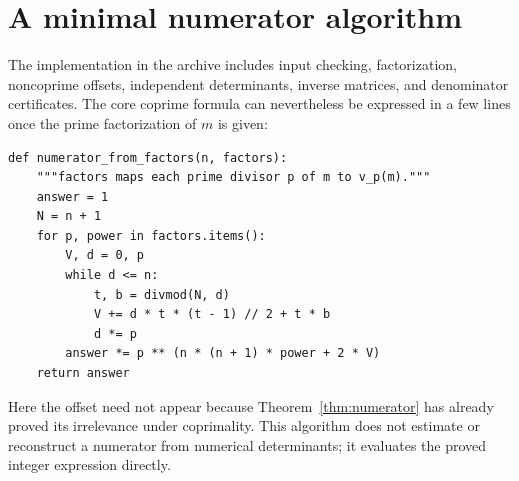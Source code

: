 \documentclass[11pt,a4paper]{article}
\numberwithin{equation}{section}
\theoremstyle{definition}
\theoremstyle{remark}
\begin{document}
\section{A minimal numerator algorithm}\label{app:algorithm}
The implementation in the archive includes input checking, factorization, noncoprime offsets, independent determinants, inverse matrices, and denominator certificates. The core coprime formula can nevertheless be expressed in a few lines once the prime factorization of $m$ is given:
\begin{lstlisting}
def numerator_from_factors(n, factors):
    """factors maps each prime divisor p of m to v_p(m)."""
    answer = 1
    N = n + 1
    for p, power in factors.items():
        V, d = 0, p
        while d <= n:
            t, b = divmod(N, d)
            V += d * t * (t - 1) // 2 + t * b
            d *= p
        answer *= p ** (n * (n + 1) * power + 2 * V)
    return answer
\end{lstlisting}
Here the offset need not appear because Theorem~\ref{thm:numerator} has already proved its irrelevance under coprimality. This algorithm does not estimate or reconstruct a numerator from numerical determinants; it evaluates the proved integer expression directly.
\end{document}
